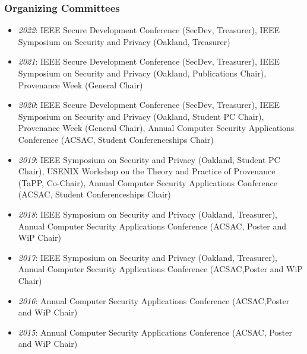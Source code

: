 \hypertarget{organizing-committees}{%
\subsubsection{Organizing Committees}\label{organizing-committees}}
\begin{itemize}
\tightlist
\item
  \emph{2022}: IEEE Secure Development Conference (SecDev, Treasurer),
  IEEE Symposium on Security and Privacy (Oakland, Treasurer)
\item
  \emph{2021}: IEEE Secure Development Conference (SecDev, Treasurer),
  IEEE Symposium on Security and Privacy (Oakland, Publications Chair),
  Provenance Week (General Chair)
\item
  \emph{2020}: IEEE Secure Development Conference (SecDev, Treasurer),
  IEEE Symposium on Security and Privacy (Oakland, Student PC Chair),
  Provenance Week (General Chair),
  Annual Computer Security Applications Conference (ACSAC, Student Conferenceships Chair)
\item
  \emph{2019}: IEEE Symposium on Security and Privacy (Oakland, Student PC Chair),
  USENIX Workshop on the Theory and Practice of Provenance (TaPP, Co-Chair),
  Annual Computer Security Applications Conference (ACSAC, Student Conferenceships Chair)
\item
  \emph{2018}: IEEE Symposium on Security and Privacy (Oakland, Treasurer),
  Annual Computer Security Applications Conference (ACSAC, Poster and WiP Chair)
\item
  \emph{2017}: IEEE Symposium on Security and Privacy (Oakland, Treasurer),
  Annual Computer Security Applications Conference (ACSAC,Poster and WiP Chair)
\item
  \emph{2016}: Annual Computer Security Applications Conference (ACSAC,Poster and WiP Chair)
\item
  \emph{2015}: Annual Computer Security Applications Conference (ACSAC, Poster and WiP Chair)
\end{itemize}

